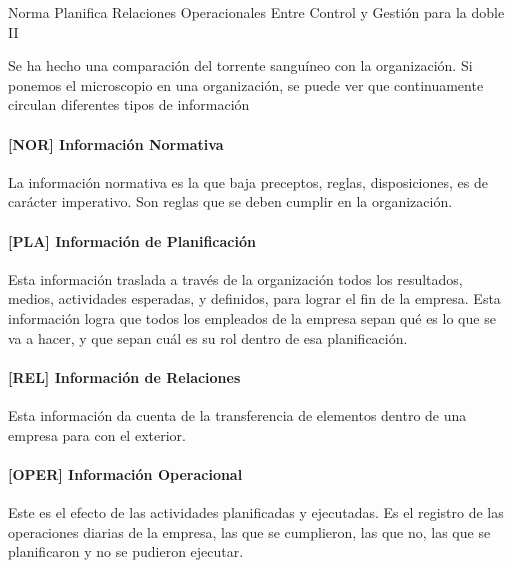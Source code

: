 {\tiny
Norma Planifica Relaciones Operacionales Entre Control y Gestión para la doble II
}


Se ha hecho una comparación del torrente sanguíneo con la organización.
Si ponemos el microscopio en una organización, se puede ver que
continuamente circulan diferentes tipos de información

\hypertarget{informaciuxf3n-normativa}{%
\paragraph{[NOR] Información Normativa}\label{informaciuxf3n-normativa}}
La información normativa es la que baja preceptos, reglas,
disposiciones, es de carácter imperativo. Son reglas que se deben
cumplir en la organización.

\hypertarget{informaciuxf3n-de-planificaciuxf3n}{%
\paragraph{[PLA] Información de
Planificación}\label{informaciuxf3n-de-planificaciuxf3n}}
Esta información traslada a través de la organización todos los
resultados, medios, actividades esperadas, y definidos, para lograr el
fin de la empresa. Esta información logra que todos los empleados de la
empresa sepan qué es lo que se va a hacer, y que sepan cuál es su rol
dentro de esa planificación.

\hypertarget{informaciuxf3n-de-relaciones}{%
\paragraph{[REL] Información de
Relaciones}\label{informaciuxf3n-de-relaciones}}
Esta información da cuenta de la transferencia de elementos dentro de
una empresa para con el exterior.

\hypertarget{informacion-operacional}{%
\paragraph{[OPER] Información Operacional}\label{informacion-operacional}}
Este es el efecto de las actividades planificadas y ejecutadas. Es el
registro de las operaciones diarias de la empresa, las que se
cumplieron, las que no, las que se planificaron y no se pudieron
ejecutar.

